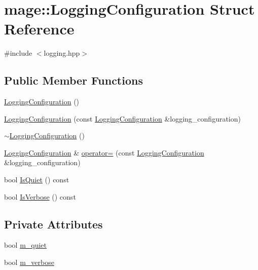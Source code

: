 \hypertarget{structmage_1_1_logging_configuration}{}\section{mage\+:\+:Logging\+Configuration Struct Reference}
\label{structmage_1_1_logging_configuration}


{\ttfamily \#include $<$logging.\+hpp$>$}

\subsection*{Public Member Functions}
\begin{DoxyCompactItemize}
\item 
\hyperlink{structmage_1_1_logging_configuration_a3d397c3ce26c1c42c9ae4a391391c6f9}{Logging\+Configuration} ()
\item 
\hyperlink{structmage_1_1_logging_configuration_afd44a8c35f8c2e2f7d75b876ae504b06}{Logging\+Configuration} (const \hyperlink{structmage_1_1_logging_configuration}{Logging\+Configuration} \&logging\+\_\+configuration)
\item 
\hyperlink{structmage_1_1_logging_configuration_ad00ecf9ceadffac0c35d102f50fbd8c7}{$\sim$\+Logging\+Configuration} ()
\item 
\hyperlink{structmage_1_1_logging_configuration}{Logging\+Configuration} \& \hyperlink{structmage_1_1_logging_configuration_af19880c8b37ae454901a19dccdf4a297}{operator=} (const \hyperlink{structmage_1_1_logging_configuration}{Logging\+Configuration} \&logging\+\_\+configuration)
\item 
bool \hyperlink{structmage_1_1_logging_configuration_ac081313b7a9440bcd73b6a9b69ff3452}{Is\+Quiet} () const
\item 
bool \hyperlink{structmage_1_1_logging_configuration_a13d91de33f888eee31f4d4e6b1237675}{Is\+Verbose} () const
\end{DoxyCompactItemize}
\subsection*{Private Attributes}
\begin{DoxyCompactItemize}
\item 
bool \hyperlink{structmage_1_1_logging_configuration_a38f457d5db84d15e008841ca8653b47c}{m\+\_\+quiet}
\item 
bool \hyperlink{structmage_1_1_logging_configuration_a60f052c2bb702d8153188e93f00427ac}{m\+\_\+verbose}
\end{DoxyCompactItemize}


